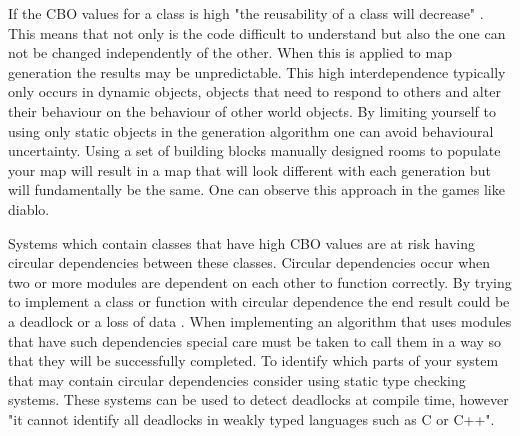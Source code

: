 \documentclass{scrartcl}
\begin{document}
If the CBO values for a class is high "the reusability of a class will decrease" \cite[p. 468]{rathore2011novel}. This means that not only is the code difficult to understand but also the one can not be changed independently of the other. When this is applied to map generation the results may be unpredictable. This high interdependence typically only occurs in dynamic objects, objects that need to respond to others and alter their behaviour on the behaviour of other world objects. By limiting yourself to using only static objects in the generation algorithm one can avoid behavioural uncertainty. Using a set of building blocks manually designed rooms to populate your map will result in a map that will look different with each generation but will fundamentally be the same. One can observe this approach in the games like diablo\cite {togelius2013procedural}. 

Systems which contain classes that have high CBO values are at risk having circular dependencies between these classes. Circular dependencies occur when two or more modules are dependent on each other to function correctly\cite{nair2016solving}. By trying to implement a class or function with circular dependence the end result could be a deadlock or a loss of data \cite {nair2016solving}. When implementing an algorithm that uses modules that have such dependencies special care must be taken to call them in a way so that they will be successfully completed. To identify which parts of your system that may contain circular dependencies consider using static type checking systems\cite{boyapati2002ownership, naik2009effective}. These systems can be used to detect deadlocks at compile time, however "it cannot identify all deadlocks in weakly typed languages such as C or C++"\cite[p.76]{pyla2010avoiding}.
\end{document}
